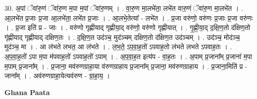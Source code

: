 \documentclass[17pt]{extarticle}
\begin{document}
30. अ॒पां ॅवा॑रु॒णं ॅवा॑रु॒ण म॒पा म॒पां ॅवा॑रु॒णम् । . वा॒रु॒ण मा॒लभे॑ता॒ लभे॑त वारु॒णं ॅवा॑रु॒ण मा॒लभे॑त । . आ॒लभे॑त प्र॒जाः प्र॒जा आ॒लभे॑ता॒ लभे॑त प्र॒जाः । . आ॒लभे॒तेत्या᳚ - लभे॑त । . प्र॒जा वरु॑णो॒ वरु॑णः प्र॒जाः प्र॒जा वरु॑णः । . प्र॒जा इति॑ प्र - जाः । . वरु॑णो गृह्णीयाद् गृह्णीया॒द् वरु॑णो॒ वरु॑णो गृह्णीयात् । . गृ॒ह्णी॒या॒द् द॒क्षि॒ण॒तो द॑क्षिण॒तो गृ॑ह्णीयाद् गृह्णीयाद् दक्षिण॒तः । . द॒क्षि॒ण॒त उद॑ञ्च॒ मुद॑ञ्चम् दक्षिण॒तो द॑क्षिण॒त उद॑ञ्चम् । . उद॑ञ्च॒ मोद॑ञ्च॒ मुद॑ञ्च॒ मा । . आ ल॑भते लभत॒ आ ल॑भते । . ल॒भ॒ते॒ ऽप॒वा॒ह॒तो॑ ऽपवाह॒तो ल॑भते लभते ऽपवाह॒तः । . अ॒प॒वा॒ह॒तो॑ ऽपा म॒पा म॑पवाह॒तो॑ ऽपवाह॒तो॑ ऽपाम् । . अ॒प॒वा॒ह॒त इत्य॑प - वा॒ह॒तः । . अ॒पाम् प्र॒जाना᳚म् प्र॒जाना॑ म॒पा म॒पाम् प्र॒जाना᳚म् । . प्र॒जाना॒ मव॑रुणग्राहा॒या व॑रुणग्राहाय प्र॒जाना᳚म् प्र॒जाना॒ मव॑रुणग्राहाय । . प्र॒जाना॒मिति॑ प्र - जाना᳚म् । . अव॑रुणग्राहा॒येत्यव॑रुण - ग्रा॒हा॒य॒ । \newline

\textbf{Ghana Paata } \newline
\end{document}
